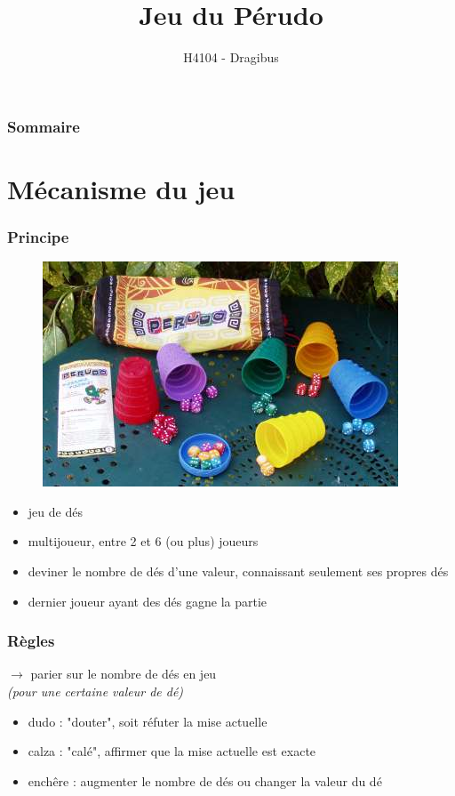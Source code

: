 \documentclass{beamer}
\title{Jeu du Pérudo}
\author{H4104 - Dragibus}
\institute{INSA de Lyon}
\begin{document}
\begin{frame}
  \titlepage
\end{frame}

\begin{frame}
  \frametitle{Sommaire}
  \tableofcontents[hideallsubsections]
\end{frame}

\section{Mécanisme du jeu}

\begin{frame}
  \frametitle{Principe}

  \begin{figure}
    \includegraphics[scale=0.4]{perudo.jpg}
  \end{figure}

  \begin{itemize}
    \item jeu de dés
    \item multijoueur, entre 2 et 6 (ou plus) joueurs
    \item deviner le nombre de dés d'une valeur, connaissant seulement ses
      propres dés
    \item dernier joueur ayant des dés gagne la partie
  \end{itemize}
\end{frame}

\begin{frame}
  \frametitle{Règles}
  $\to$ parier sur le nombre de dés en jeu \\
  \emph{(pour une certaine valeur de dé)}

  \begin{itemize}
    \item dudo : "douter", soit réfuter la mise actuelle
    \item calza : "calé", affirmer que la mise actuelle est exacte
    \item enchêre : augmenter le nombre de dés ou changer la valeur du dé
  \end{itemize}

  \\[5mm]
\end{frame}
\end{document}
